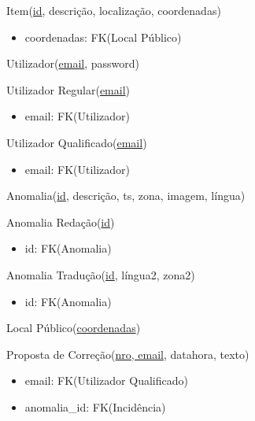 \documentclass[12pt]{report}
\begin{document}
\begin{multicols}{2}
Item(\underline{id}, descrição, localização, coordenadas)
    \begin{itemize}
    \item coordenadas: FK(Local Público)
    \end{itemize}

\vspace{5mm}


Utilizador(\underline{email}, password)

Utilizador Regular(\underline{email})
    \begin{itemize}
    \item email: FK(Utilizador)
    \end{itemize}


Utilizador Qualificado(\underline{email})
    \begin{itemize}
    \item email: FK(Utilizador)
    \end{itemize}

\vspace{5mm}



Anomalia(\underline{id}, descrição, ts, zona, imagem, língua)


Anomalia Redação(\underline{id})
    \begin{itemize}
    \item id: FK(Anomalia)
    \end{itemize}


Anomalia Tradução(\underline{id}, língua2, zona2)
    \begin{itemize}
    \item id: FK(Anomalia)
    \end{itemize}


\vspace{5mm}


Local Público(\underline{coordenadas})


\vspace{5mm}


Proposta de Correção(\underline{nro, email}, datahora, texto)
    \begin{itemize}
	    \item email: FK(Utilizador Qualificado)
	    \item anomalia\_id: FK(Incidência)
    \end{itemize}




\end{multicols}
\end{document}
